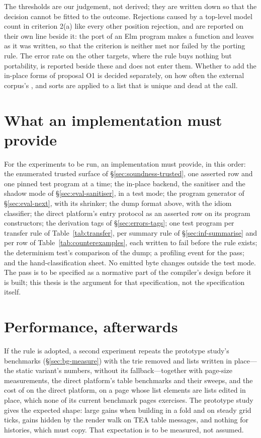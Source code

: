The thresholds are our judgement, not derived; they are written down so that the decision cannot be
fitted to the outcome. Rejections caused by a top-level model count in criterion 2(a) like every other
position rejection, and are reported on their own line beside it: the port of an Elm program makes
 a function and leaves  as it was written, so that the criterion is neither
met nor failed by the porting rule. The error rate on the other targets, where the rule buys nothing but portability,
is reported beside these and does not enter them. Whether to add the in-place forms of proposal O1 is
decided separately, on how often the external corpus's ,  and sorts are applied to a
list that is unique and dead at the call.

\section{What an implementation must provide}
\label{sec:eval-brief}

For the experiments to be run, an implementation must provide, in this order: the enumerated trusted
surface of \S\ref{sec:soundness-trusted}, one asserted row and one pinned test program at a time; the
in-place backend, the sanitiser and the shadow mode of \S\ref{sec:eval-sanitiser}, in a test mode; the
program generator of \S\ref{sec:eval-next}, with its shrinker; the dump format above,
with the idiom classifier; the direct platform's entry protocol as an asserted row on its program
constructors; the derivation tags of \S\ref{sec:errors-tags}; one test program per
transfer rule of Table~\ref{tab:transfer}, per summary rule of \S\ref{sec:inf-summarise} and per row of
Table~\ref{tab:counterexamples}, each written to fail before the rule exists; the determinism test's
comparison of the dump; a profiling event for the pass; and the hand-classification sheet. No emitted byte
changes outside the test mode. The pass is to be specified as a normative part of the compiler's design
before it is built; this thesis is the argument for that specification, not the specification itself.

\section{Performance, afterwards}
\label{sec:eval-perf}

If the rule is adopted, a second experiment repeats the prototype study's benchmarks
(\S\ref{sec:bg-measure}) with the trie removed and lists written in place---the static variant's
numbers, without its fallback---together with page-size measurements, the direct platform's table
benchmarks and their sweeps,
and the cost of  on the direct platform, on a page whose list elements are lists edited in place,
which none of its current benchmark pages exercises. The prototype study gives the expected shape:
large gains when building in a fold and on steady grid ticks, gains hidden by the render walk on TEA table
messages, and nothing for histories, which must copy. That expectation is to be measured, not assumed.
